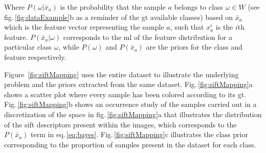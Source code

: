 \documentclass[a4paper, 10pt, conference]{llncs}      %
\begin{document}
Where $P(\omega|\bar{x}_a)$ is the probability that the sample $a$ belongs to class $\omega \in W$ (see fig.\,\ref{fig:dataExample}b as a reminder of the \ac{gt} available classes) based on $\bar{x}_a$ which is the feature vector representing the sample $a$, such that $x_a^i$ is the $i$th feature. $P(\bar{x}_a|\omega)$ corresponds to the \ac{ml} of the feature distribution for a particular class $\omega$, while $P(\omega)$ and $P(\bar{x}_a)$ are the priors for the class and feature respectively.

Figure~\ref{fig:siftMapping}  uses the entire dataset to illustrate the underlying problem and the priors extracted from the same dataset. Fig.\,\ref{fig:siftMapping}a shows a scatter plot where every sample has been colored according to its \ac{gt}. Fig.\,\ref{fig:siftMapping}b shows an occurrence study of the samples carried out in a discretization of the space in fig.\,\ref{fig:siftMapping}a that illustrates the distribution of the \ac{sift} descriptors present within the images, which corresponds to the $P(\bar{x}_a)$ term in eq.\,\ref{eq:bayes}. Fig.\,\ref{fig:siftMapping}c illustrates the class prior corresponding to the proportion of samples present in the dataset for each class.
\end{document}
